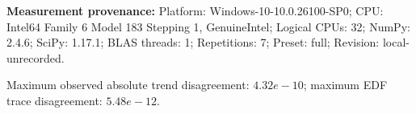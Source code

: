 \noindent\textbf{Measurement provenance:} Platform: Windows-10-10.0.26100-SP0; CPU: Intel64 Family 6 Model 183 Stepping 1, GenuineIntel; Logical CPUs: 32; NumPy: 2.4.6; SciPy: 1.17.1; BLAS threads: 1; Repetitions: 7; Preset: full; Revision: local-unrecorded.

\noindent Maximum observed absolute trend disagreement: $4.32e-10$; maximum EDF trace disagreement: $5.48e-12$.
